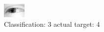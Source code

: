 \begin{figure}[h!]
\begin{center}
\includegraphics[width=0.60\columnwidth]{figures/ID2505_class_3_target_4.png}
\end{center}
\caption{ Classification: 3 actual target: 4}
\label{fig:ID2505_class_3_target_4}
\end{figure}
